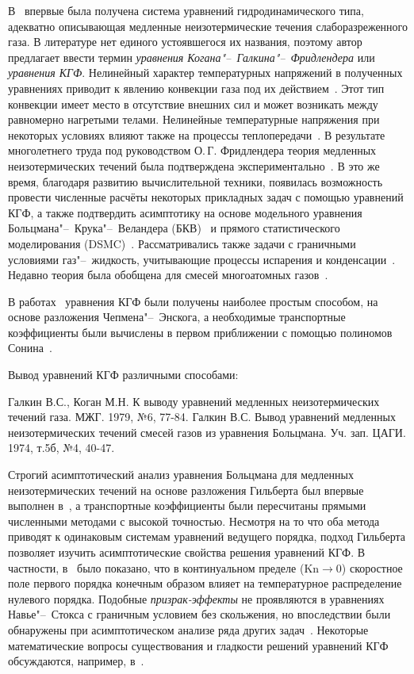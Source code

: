 \documentclass[
aps,%
12pt,%
final,%
notitlepage,%
oneside,%
onecolumn,%
nobibnotes,%
nofootinbib,%
superscriptaddress,%
noshowpacs,%
centertags]%
{revtex4}
\newcommand{\Kn}{\mathrm{Kn}}
\begin{document}
В~\cite{Kogan1970} впервые была получена система уравнений гидродинамического типа,
адекватно описывающая медленные неизотермические течения слаборазреженного газа.
В литературе нет единого устоявшегося их названия,
поэтому автор предлагает ввести термин \emph{уравнения Когана"--~Галкина"--~Фридлендера}
или \emph{уравнения КГФ}.
Нелинейный характер температурных напряжений в полученных уравнениях приводит к
явлению конвекции газа под их действием~\cite{Kogan1971}.
Этот тип конвекции имеет место в отсутствие внешних сил и может возникать между равномерно нагретыми телами.
Нелинейные температурные напряжения при некоторых условиях влияют также на процессы теплопередачи~\cite{Friedlander1978}.
В результате многолетнего труда под руководством О.\,Г. Фридлендера теория медленных неизотермических течений
была подтверждена экспериментально~\cite{Friedlander1997, Friedlander2003}.
В это же время, благодаря развитию вычислительной техники, появилась возможность провести численные расчёты
некоторых прикладных задач с помощью уравнений КГФ, а также подтвердить асимптотику на основе модельного уравнения
Больцмана"--~Крука"--~Веландера (БКВ)~\cite{Alexandrov2002, Aoki2006, Alexandrov2008b, Alexandrov2011}
и прямого статистического моделирования (DSMC)~\cite{Alexandrov2008a, Aoki2007}.
Рассматривались также задачи с граничными условиями газ"--~жидкость,
учитывающие процессы испарения и конденсации~\cite{Aoki2007}.
Недавно теория была обобщена для смесей многоатомных газов~\cite{Galkin2015}.

В работах~\cite{Kogan1970,Kogan1971,Kogan1976} уравнения КГФ были получены наиболее простым способом,
на основе разложения Чепмена"--~Энскога, а необходимые транспортные коэффициенты были
вычислены в первом приближении с помощью полиномов Сонина~\cite{Chapman1960}.

Вывод уравнений КГФ различными способами:

Галкин В.С., Коган М.Н. К выводу уравнений медленных неизотермических течений газа. МЖГ. 1979, №6, 77-84.
Галкин В.С. Вывод уравнений медленных неизотермических течений смесей газов из уравнения Больцмана. Уч. зап. ЦАГИ. 1974, т.5б, №4, 40-47.

Строгий асимптотический анализ уравнения Больцмана для медленных неизотермических течений
на основе разложения Гильберта был впервые выполнен в~\cite{Sone1996},
а транспортные коэффициенты были пересчитаны прямыми численными методами с высокой точностью.
Несмотря на то что оба метода приводят к одинаковым системам уравнений ведущего порядка,
подход Гильберта позволяет изучить асимптотические свойства решения уравнений КГФ.
В частности, в~\cite{Sone1996} было показано, что в континуальном пределе (\(\Kn\to0\))
скоростное поле первого порядка конечным образом влияет на температурное распределение нулевого порядка.
Подобные \emph{призрак-эффекты} не проявляются в уравнениях Навье"--~Стокса с граничным условием без скольжения,
но впоследствии были обнаружены при асимптотическом анализе ряда других задач~\cite{Sone2007}.
Некоторые математические вопросы существования и гладкости решений уравнений КГФ обсуждаются,
например, в~\cite{Tan2016}.
\end{document}
